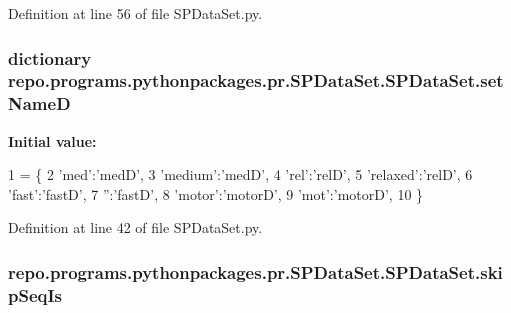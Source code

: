 Definition at line 56 of file S\-P\-Data\-Set.\-py.

\hypertarget{classrepo_1_1programs_1_1pythonpackages_1_1pr_1_1SPDataSet_1_1SPDataSet_a27aa119d0f7a644bb2ca116a89daee82}{
\subsubsection[{set\-Name\-D}]{\setlength{\rightskip}{0pt plus 5cm}dictionary repo.\-programs.\-pythonpackages.\-pr.\-S\-P\-Data\-Set.\-S\-P\-Data\-Set.\-set\-Name\-D\hspace{0.3cm}{\ttfamily [static]}}}\label{classrepo_1_1programs_1_1pythonpackages_1_1pr_1_1SPDataSet_1_1SPDataSet_a27aa119d0f7a644bb2ca116a89daee82}
{\bfseries Initial value\-:}
\begin{DoxyCode}
1 = \{
2               \textcolor{stringliteral}{'med'}:\textcolor{stringliteral}{'medD'},
3               \textcolor{stringliteral}{'medium'}:\textcolor{stringliteral}{'medD'},
4               \textcolor{stringliteral}{'rel'}:\textcolor{stringliteral}{'relD'},
5               \textcolor{stringliteral}{'relaxed'}:\textcolor{stringliteral}{'relD'},
6               \textcolor{stringliteral}{'fast'}:\textcolor{stringliteral}{'fastD'},
7               \textcolor{stringliteral}{''}:\textcolor{stringliteral}{'fastD'},
8               \textcolor{stringliteral}{'motor'}:\textcolor{stringliteral}{'motorD'},
9               \textcolor{stringliteral}{'mot'}:\textcolor{stringliteral}{'motorD'},
10             \}
\end{DoxyCode}


Definition at line 42 of file S\-P\-Data\-Set.\-py.

\hypertarget{classrepo_1_1programs_1_1pythonpackages_1_1pr_1_1SPDataSet_1_1SPDataSet_a8250ad2059e08940bf8cd519c30e7a04}{
\subsubsection[{skip\-Seq\-Is}]{\setlength{\rightskip}{0pt plus 5cm}repo.\-programs.\-pythonpackages.\-pr.\-S\-P\-Data\-Set.\-S\-P\-Data\-Set.\-skip\-Seq\-Is}}\label{classrepo_1_1programs_1_1pythonpackages_1_1pr_1_1SPDataSet_1_1SPDataSet_a8250ad2059e08940bf8cd519c30e7a04}


